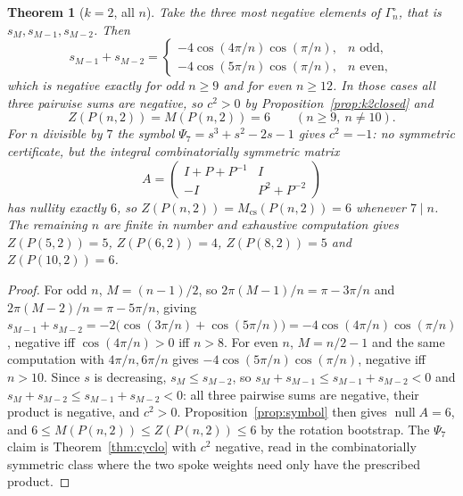 \documentclass[11pt]{article}
\newtheorem{theorem}{Theorem}
\theoremstyle{definition}
\begin{document}
\begin{theorem}[$k=2$, all $n$]\label{thm:k2all}
Take the three most negative elements of $\Gamma^{\circ}_n$, that is
$s_M,s_{M-1},s_{M-2}$. Then
\[
  s_{M-1}+s_{M-2}=
  \begin{cases}
    -4\cos(4\pi/n)\cos(\pi/n), & n \text{ odd},\\
    -4\cos(5\pi/n)\cos(\pi/n), & n \text{ even},
  \end{cases}
\]
which is negative exactly for odd $n\ge9$ and for even $n\ge12$. In those
cases all three pairwise sums are negative, so $c^{2}>0$ by
Proposition~\ref{prop:k2closed} and
\[
  Z(P(n,2))=M(P(n,2))=6 \qquad (n\ge9,\ n\ne10).
\]
For $n$ divisible by $7$ the symbol $\Psi_7=s^{3}+s^{2}-2s-1$ gives
$c^{2}=-1$: no symmetric certificate, but the integral combinatorially
symmetric matrix
\[
  A=\begin{pmatrix} I+P+P^{-1} & I\\ -I & P^{2}+P^{-2}\end{pmatrix}
\]
has nullity exactly $6$, so $Z(P(n,2))=M_{\mathrm{cs}}(P(n,2))=6$ whenever
$7\mid n$. The remaining $n$ are finite in number and exhaustive computation
gives $Z(P(5,2))=5$, $Z(P(6,2))=4$, $Z(P(8,2))=5$ and $Z(P(10,2))=6$.
\end{theorem}

\begin{proof}
For odd $n$, $M=(n-1)/2$, so $2\pi(M-1)/n=\pi-3\pi/n$ and
$2\pi(M-2)/n=\pi-5\pi/n$, giving
$s_{M-1}+s_{M-2}=-2\bigl(\cos(3\pi/n)+\cos(5\pi/n)\bigr)
=-4\cos(4\pi/n)\cos(\pi/n)$, negative iff $\cos(4\pi/n)>0$ iff $n>8$. For
even $n$, $M=n/2-1$ and the same computation with $4\pi/n,6\pi/n$ gives
$-4\cos(5\pi/n)\cos(\pi/n)$, negative iff $n>10$. Since $s$ is decreasing,
$s_M\le s_{M-2}$, so $s_M+s_{M-1}\le s_{M-1}+s_{M-2}<0$ and
$s_M+s_{M-2}\le s_{M-1}+s_{M-2}<0$: all three pairwise sums are negative,
their product is negative, and $c^{2}>0$. Proposition~\ref{prop:symbol} then
gives $\operatorname{null}A=6$, and $6\le M(P(n,2))\le Z(P(n,2))\le6$ by the
rotation bootstrap. The $\Psi_7$ claim is Theorem~\ref{thm:cyclo} with $c^{2}$
negative, read in the combinatorially symmetric class where the two spoke
weights need only have the prescribed product.
\end{proof}
\end{document}
